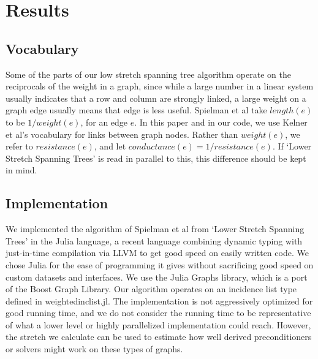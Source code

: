 \documentclass{article}
\begin{document}
\section*{Results}
\subsection*{Vocabulary}
Some of the parts of our low stretch spanning tree algorithm operate on the reciprocals of the weight in a graph, since while a large number in a linear system usually indicates that a row and column are strongly linked, a large weight on a graph edge usually means that edge is less useful.  Spielman et al take $length(e)$ to be $1/weight(e)$, for an edge $e$.  In this paper and in our code, we use Kelner et al's vocabulary for links between graph nodes.  Rather than $weight(e)$, we refer to $resistance(e)$, and let $conductance(e)=1/resistance(e)$.  If `Lower Stretch Spanning Trees' is read in parallel to this, this difference should be kept in mind.  
\subsection{Implementation}
We implemented the algorithm of Spielman et al from `Lower Stretch Spanning Trees' in the Julia language\cite{juliawebsite}, a recent language combining dynamic typing with just-in-time compilation via LLVM to get good speed on easily written code.  We chose Julia for the ease of programming it gives without sacrificing good speed on custom datasets and interfaces.  We use the Julia Graphs library\cite{juliagraphs}, which is a port of the Boost Graph Library.  Our algorithm operates on an incidence list type defined in weightedinclist.jl.  The implementation is not aggressively optimized for good running time, and we do not consider the running time to be representative of what a lower level or highly parallelized implementation could reach.  However, the stretch we calculate can be used to estimate how well derived preconditioners or solvers might work on these types of graphs.\\
\end{document}
